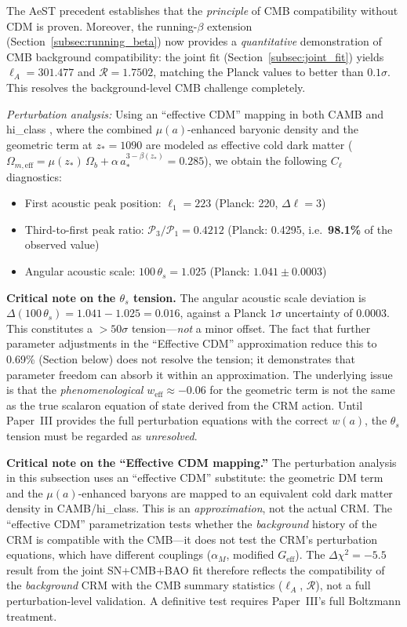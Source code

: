 \documentclass[aps,prd,twocolumn,superscriptaddress,nofootinbib,floatfix]{revtex4-2}
\begin{document}
The AeST precedent establishes that the \textit{principle} of CMB compatibility without CDM is proven. Moreover, the running-$\beta$ extension (Section~\ref{subsec:running_beta}) now provides a \textit{quantitative} demonstration of CMB background compatibility: the joint fit (Section~\ref{subsec:joint_fit}) yields $\ell_A = 301.477$ and $\mathcal{R} = 1.7502$, matching the Planck values to better than $0.1\sigma$. This resolves the background-level CMB challenge completely.

\textit{Perturbation analysis:} Using an ``effective CDM'' mapping in both CAMB \cite{Lewis2000} and hi\_class \cite{Zumalacarregui2017}, where the combined $\mu(a)$-enhanced baryonic density and the geometric term at $z_* = 1090$ are modeled as effective cold dark matter ($\Omega_{m,\mathrm{eff}} = \mu(z_*)\,\Omega_b + \alpha\,a_*^{3-\beta(z_*)} = 0.285$), we obtain the following $C_\ell$ diagnostics:
\begin{itemize}
\item First acoustic peak position: $\ell_1 = 223$ (Planck: 220, $\Delta\ell = 3$)
\item Third-to-first peak ratio: $\mathcal{P}_3/\mathcal{P}_1 = 0.4212$ (Planck: 0.4295, i.e.\ \textbf{98.1\%} of the observed value)
\item Angular acoustic scale: $100\,\theta_s = 1.025$ (Planck: $1.041 \pm 0.0003$)
\end{itemize}

\textbf{Critical note on the $\theta_s$ tension.} The angular acoustic scale deviation is $\Delta(100\,\theta_s) = 1.041 - 1.025 = 0.016$, against a Planck $1\sigma$ uncertainty of 0.0003. This constitutes a $>50\sigma$ tension---\emph{not} a minor offset. The fact that further parameter adjustments in the ``Effective CDM'' approximation reduce this to 0.69\% (Section below) does not resolve the tension; it demonstrates that parameter freedom can absorb it within an approximation. The underlying issue is that the \textit{phenomenological} $w_\mathrm{eff} \approx -0.06$ for the geometric term is not the same as the true scalaron equation of state derived from the CRM action. Until Paper~III provides the full perturbation equations with the correct $w(a)$, the $\theta_s$ tension must be regarded as \emph{unresolved}.

\textbf{Critical note on the ``Effective CDM mapping.''} The perturbation analysis in this subsection uses an ``effective CDM'' substitute: the geometric DM term and the $\mu(a)$-enhanced baryons are mapped to an equivalent cold dark matter density in CAMB/hi\_class. This is an \emph{approximation}, not the actual CRM. The ``effective CDM'' parametrization tests whether the \emph{background} history of the CRM is compatible with the CMB---it does not test the CRM's perturbation equations, which have different couplings ($\alpha_M$, modified $G_\mathrm{eff}$). The $\Delta\chi^2 = -5.5$ result from the joint SN+CMB+BAO fit therefore reflects the compatibility of the \emph{background} CRM with the CMB summary statistics ($\ell_A$, $\mathcal{R}$), not a full perturbation-level validation. A definitive test requires Paper~III's full Boltzmann treatment.
\end{document}
